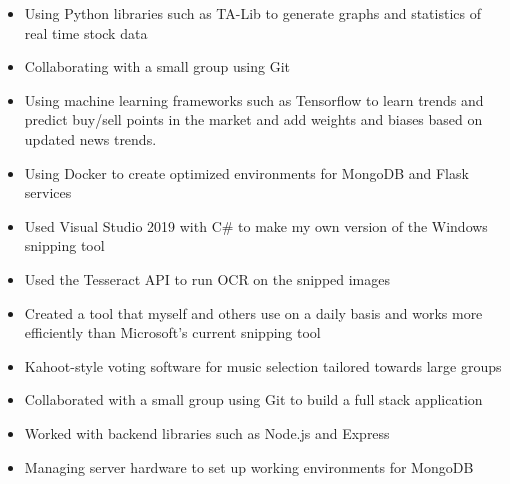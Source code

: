 \documentclass[10pt,a4paper,ragged2e]{altacv}
\begin{document}

\begin{fullwidth}
\makecvheader
\end{fullwidth}


\begin{itemize}
\item Using Python libraries such as TA-Lib to generate graphs and statistics of real time stock data
\smallskip
\item Collaborating with a small group using Git
\smallskip
\item Using machine learning frameworks such as Tensorflow to learn trends and predict buy/sell points in the market and add weights and biases based on updated news trends.
\smallskip
\item Using Docker to create optimized environments for MongoDB and Flask services
\end{itemize}
\smallskip
\smallskip
{}
\begin{itemize}
\item Used Visual Studio 2019 with C\# to make my own version of the Windows snipping tool
\smallskip
\item Used the Tesseract API to run OCR on the snipped images
\smallskip
\item Created a tool that myself and others use on a daily basis and works more efficiently than Microsoft's current snipping tool
\end{itemize}
\smallskip
\smallskip
{}
\begin{itemize}
\item Kahoot-style voting software for music selection tailored towards large groups
\smallskip
\item Collaborated with a small group using Git to build a full stack application
\smallskip
\item Worked with backend libraries such as Node.js and Express
\smallskip
\item Managing server hardware to set up working environments for MongoDB
\end{itemize}
\end{document}
